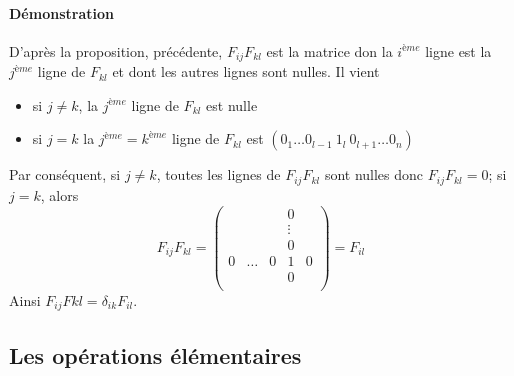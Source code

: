 \paragraph{Démonstration} D'après la proposition, précédente, $F_{ij} F_{kl}$ est la matrice don la $i^{ème}$ ligne est la $j^{ème}$ ligne de $F_{kl}$ et dont les autres lignes sont nulles. Il vient
\begin{itemize}
  \item si $j\neq k$, la $j^{ème}$ ligne de $F_{kl}$ est nulle
  \item si $j = k$ la $j^{ème} = k^{ème}$ ligne de $F_{kl}$ est $(0_{1} \ldots 0_{l-1} ~ 1_{l} ~ 0_{l+1} \ldots 0_{n})$
\end{itemize}
Par conséquent, si $j\neq k$, toutes les lignes de $F_{ij} F_{kl}$ sont nulles donc $F_{ij} F_{kl} = 0$; si $j=k$, alors 
$$F_{ij} F_{kl} = \begin{pmatrix} 
  & & & 0 & \\
  & & & \vdots & \\
  & & & 0 & \\
  0 & \ldots & 0 & 1 & 0 \\
  & & & 0 & \\
\end{pmatrix} = F_{il}$$
Ainsi $F_{ij} F{kl} = \delta_{ik} F_{il}$.

%
\subsection{Les opérations élémentaires}
%

